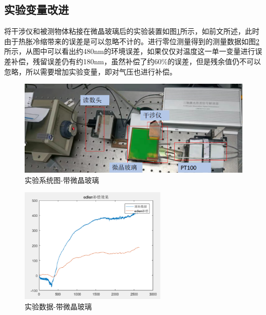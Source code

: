 \subsection{实验变量改进}
将干涉仪和被测物体粘接在微晶玻璃后的实验装置如图\ref{fig:实验系统图-带微晶玻璃}所示，如前文所述，此时由于热胀冷缩带来的误差是可以忽略不计的。进行零位测量得到的测量数据如图\ref{fig:实验数据-带微晶玻璃}所示，从图中可以看出约480nm的环境误差，如果仅仅对温度这一单一变量进行误差补偿，残留误差仍有约180nm，虽然补偿了约$60\%$的误差，但是残余值仍不可以忽略，所以需要增加实验变量，即对气压也进行补偿。
\begin{figure}[htb]
  \centering
  \includegraphics[width=12cm]{fig/3-fig/实验系统图-带微晶玻璃.jpg}
  \caption{实验系统图-带微晶玻璃}
  \label{fig:实验系统图-带微晶玻璃}
\end{figure}
\begin{figure}[htb]
  \centering
  \includegraphics[width=7cm]{fig/3-fig/实验数据-带微晶玻璃.jpg}
  \caption{实验数据-带微晶玻璃}
  \label{fig:实验数据-带微晶玻璃}
\end{figure}

